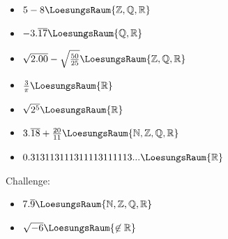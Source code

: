 \begin{itemize}
\item $5-8 \LoesungsRaum{\mathbb{Z,Q,R}}$
\item $-3.\overline{17} \LoesungsRaum{\mathbb{Q,R}}$
\item $\sqrt{2.00} - \sqrt{\frac{50}{25}} \LoesungsRaum{\mathbb{Z,Q,R}}$
\item $\frac{3}{\pi} \LoesungsRaum{\mathbb{R}}$
\item $\sqrt{2^5}\LoesungsRaum{\mathbb{R}}$
\item $3.\overline{18}+\frac{20}{11} \LoesungsRaum{\mathbb{N,Z,Q,R}}$
\item $0.313113111311113111113... \LoesungsRaum{\mathbb{R}}$
\end{itemize}
Challenge:
\begin{itemize}
\item $7.\overline{9} \LoesungsRaum{\mathbb{N,Z,Q,R}}$
\item $\sqrt{-6} \LoesungsRaum{\not\in\mathbb{R}}$
\end{itemize} 


